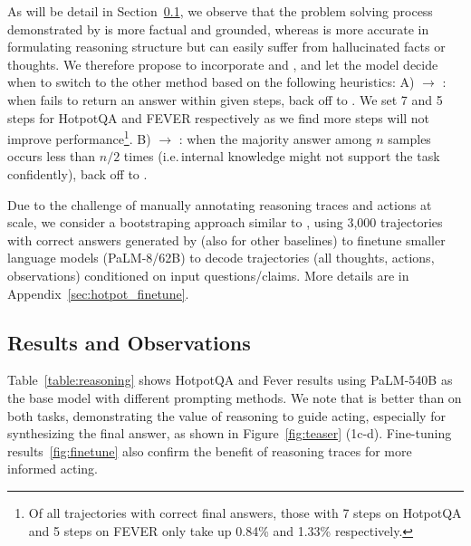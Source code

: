  As will be detail in Section~\ref{subsec:results}, we observe that the problem solving process demonstrated by \model{} is more factual and grounded, whereas \reason{} is more accurate in formulating reasoning structure but can easily suffer from hallucinated facts or thoughts. We therefore propose to incorporate \model{}  and \reasons{}, and let the model decide when to switch to the other method based on the following heuristics:
    A) 
    \textbf{\model{} $\to$ \reasons{}}: when \model{} fails to return an answer within given steps, back off to \reasons{}. We set 7 and 5 steps for HotpotQA and FEVER respectively as we find more steps will not improve \model{} performance\footnote{{Of all trajectories with correct final answers, those with 7 steps on HotpotQA and 5 steps on FEVER only take up 0.84\% and 1.33\% respectively.}}. 
    B) 
    \textbf{  \reasons{} $\to$  \model{}}: when the majority answer among $n$ \reasons{} samples occurs less than $n/2$ times (i.e.\,internal knowledge might not support the task confidently), back off to \model{}. 


 Due to the challenge of manually annotating reasoning traces and actions at scale, we consider a bootstraping approach similar to \citet{zelikman2022star}, using 3,000 trajectories with correct answers generated by \model{} (also for other baselines) to finetune smaller language models (PaLM-8/62B) to decode trajectories (all thoughts, actions, observations) conditioned on input questions/claims. More details are in Appendix~\ref{sec:hotpot_finetune}.






\subsection{Results and Observations} \label{subsec:results}


 Table~\ref{table:reasoning} shows HotpotQA and Fever results using PaLM-540B as the base model with different prompting methods. 
We note that \model{} is better than \act{} on both tasks, demonstrating the value of reasoning to guide acting, especially for synthesizing the final answer, as shown in Figure~\ref{fig:teaser} (1c-d). Fine-tuning results~\ref{fig:finetune} also confirm the benefit of reasoning traces for more informed acting.





